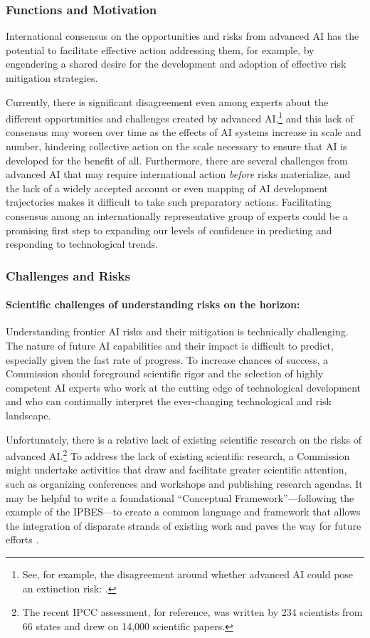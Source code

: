 \documentclass[12pt]{article}
\begin{document}
\subsubsection*{Functions and
Motivation}

International consensus on the opportunities and risks from advanced AI
has the potential to facilitate effective action addressing them, for
example, by engendering a shared desire for the development and adoption
of effective risk mitigation strategies.

Currently, there is significant disagreement even among experts about
the different opportunities and challenges created by advanced
AI,\footnote{See, for example, the disagreement around whether advanced
  AI could pose an extinction risk: \cite{noauthor_statement_2023, noauthor_editorial_2023}.}
and this lack of consensus may worsen over time as the effects of AI
systems increase in scale and number, hindering collective action on the
scale necessary to ensure that AI is developed for the benefit of all.
Furthermore, there are several challenges from advanced AI that may
require international action \emph{before} risks materialize, and the lack of a widely accepted
account or even mapping of AI development trajectories makes it
difficult to take such preparatory actions. Facilitating consensus among
an internationally representative group of experts could be a promising
first step to expanding our levels of confidence in predicting and responding to
technological trends.


\subsubsection*{Challenges and Risks}

\paragraph{Scientific challenges of understanding risks on the horizon:}
Understanding frontier AI risks and their mitigation is technically
challenging. The nature of future AI capabilities and their impact is
difficult to predict, especially given the fast rate of progress. To
increase chances of success, a Commission should foreground scientific
rigor and the selection of highly competent AI experts who work at the
cutting edge of technological development and who can continually
interpret the ever-changing technological and risk landscape.

Unfortunately, there is a relative lack of existing scientific research
on the risks of advanced AI.\footnote{The recent IPCC assessment, for
  reference, was written by 234 scientists from 66 states and drew on
  14,000 scientific papers.} To address the lack of existing scientific
research, a Commission might undertake activities that draw and
facilitate greater scientific attention, such as organizing conferences
and workshops and publishing research agendas. It may be helpful to
write a foundational ``Conceptual Framework''---following the example of
the IPBES---to create a common language and framework that
allows the integration of disparate strands of existing work and paves
the way for future efforts \cite{diaz_ipbes_2015}.
\end{document}
